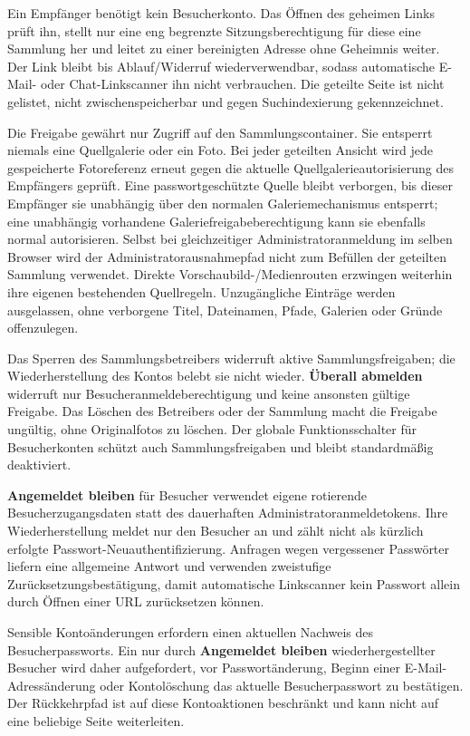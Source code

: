 \documentclass[11pt,a4paper]{article}
\newcommand{\ui}[1]{\textbf{#1}}
\begin{document}
Ein Empfänger benötigt kein Besucherkonto. Das Öffnen des geheimen Links prüft
ihn, stellt nur eine eng begrenzte Sitzungsberechtigung für diese eine Sammlung
her und leitet zu einer bereinigten Adresse ohne Geheimnis weiter. Der Link
bleibt bis Ablauf/Widerruf wiederverwendbar, sodass automatische E-Mail- oder
Chat-Linkscanner ihn nicht verbrauchen. Die geteilte Seite ist nicht gelistet,
nicht zwischenspeicherbar und gegen Suchindexierung gekennzeichnet.

Die Freigabe gewährt nur Zugriff auf den Sammlungscontainer. Sie entsperrt
niemals eine Quellgalerie oder ein Foto. Bei jeder geteilten Ansicht wird jede
gespeicherte Fotoreferenz erneut gegen die aktuelle Quellgalerieautorisierung
des Empfängers geprüft. Eine passwortgeschützte Quelle bleibt verborgen, bis
dieser Empfänger sie unabhängig über den normalen Galeriemechanismus entsperrt;
eine unabhängig vorhandene Galeriefreigabeberechtigung kann sie ebenfalls normal
autorisieren. Selbst bei gleichzeitiger Administratoranmeldung im selben Browser
wird der Administratorausnahmepfad nicht zum Befüllen der geteilten Sammlung
verwendet. Direkte Vorschaubild-/Medienrouten erzwingen weiterhin ihre eigenen
bestehenden Quellregeln. Unzugängliche Einträge werden ausgelassen, ohne
verborgene Titel, Dateinamen, Pfade, Galerien oder Gründe offenzulegen.

Das Sperren des Sammlungsbetreibers widerruft aktive Sammlungsfreigaben; die
Wiederherstellung des Kontos belebt sie nicht wieder. \ui{Überall abmelden}
widerruft nur Besucheranmeldeberechtigung und keine ansonsten gültige Freigabe.
Das Löschen des Betreibers oder der Sammlung macht die Freigabe ungültig, ohne
Originalfotos zu löschen. Der globale Funktionsschalter für Besucherkonten
schützt auch Sammlungsfreigaben und bleibt standardmäßig deaktiviert.

\ui{Angemeldet bleiben} für Besucher verwendet eigene rotierende
Besucherzugangsdaten statt des dauerhaften Administratoranmeldetokens. Ihre
Wiederherstellung meldet nur den Besucher an und zählt nicht als kürzlich
erfolgte Passwort-Neuauthentifizierung. Anfragen wegen vergessener Passwörter
liefern eine allgemeine Antwort und verwenden zweistufige
Zurücksetzungsbestätigung, damit automatische Linkscanner kein Passwort allein
durch Öffnen einer URL zurücksetzen können.

Sensible Kontoänderungen erfordern einen aktuellen Nachweis des
Besucherpassworts. Ein nur durch \ui{Angemeldet bleiben} wiederhergestellter
Besucher wird daher aufgefordert, vor Passwortänderung, Beginn einer
E-Mail-Adressänderung oder Kontolöschung das aktuelle Besucherpasswort zu
bestätigen. Der Rückkehrpfad ist auf diese Kontoaktionen beschränkt und kann
nicht auf eine beliebige Seite weiterleiten.
\end{document}
